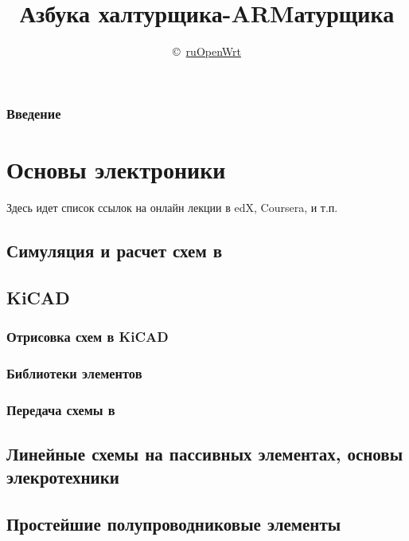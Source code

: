 

\author{\copyright\
\href{https://groups.google.com/forum/\#!forum/openwrt2ru}{ruOpenWrt}}
\title{Азбука халтурщика-ARMатурщика}


\maketitle
\tableofcontents

\section*{Введение}

\part{Основы электроники}

Здесь идет список ссылок на онлайн лекции в edX, Coursera, и т.п.

\chapter{Симуляция и расчет схем в \spice}

\chapter{KiCAD} 

\section{Отрисовка схем в KiCAD}

\section{Библиотеки элементов}

\section{Передача схемы в \spice}

\chapter{Линейные схемы на пассивных элементах, основы элекротехники}

\chapter{Простейшие полупроводниковые элементы}

